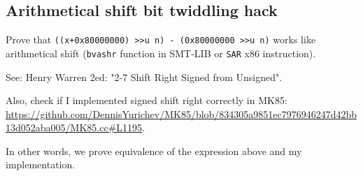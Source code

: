 \subsection{Arithmetical shift bit twiddling hack}

Prove that \verb|((x+0x80000000) >>u n) - (0x80000000 >>u n)| 
works like arithmetical shift (\verb|bvashr| function in SMT-LIB or \verb|SAR| x86 instruction).

See: Henry Warren 2ed: "2-7 Shift Right Signed from Unsigned".

Also, check if I implemented signed shift right correctly in MK85:
\url{https://github.com/DennisYurichev/MK85/blob/834305a9851ec7976946247d42bb13d052aba005/MK85.cc#L1195}.

In other words, we prove equivalence of the expression above and my implementation.



